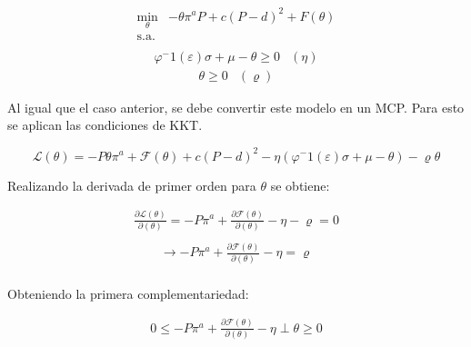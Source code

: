 \begin{equation}
\begin{array}{rrclcl}
   \displaystyle \min_{\theta} & -\theta \pi^aP + c(P-d)^2+F(\theta) \\\textrm{s.a.} \label{eq:perforconrestr}\\
\end{array}
\end{equation}
\begin{equation}
\begin{array}{cl}
    \varphi^-1 (\varepsilon )\sigma + \mu - \theta \geq 0 & (\eta)  \label{perforconrestr:r1}
\end{array}
\end{equation}
\begin{equation}
\begin{array}{cl}
    \theta \geq 0 & (\varrho)
\end{array}
\end{equation}

Al igual que el caso anterior, se debe convertir este modelo en un MCP. Para esto se aplican las condiciones de KKT.

$$\mathcal{L}(\theta)=-P\theta\pi^a+\mathcal{F}(\theta)+c(P-d)^2 -\eta(\varphi^-1 (\varepsilon )\sigma + \mu - \theta)- \varrho\theta $$

Realizando la derivada de primer orden para $\theta$ se obtiene:

\begin{equation}
\begin{array}{rrclcl}
    \frac{\partial\mathcal{L}(\theta)}{\partial (\theta)}=-P\pi^a+\frac{\partial\mathcal{F}(\theta)}{\partial(\theta)}-\eta -\varrho=0 \label{lag20}\\
\end{array}
\end{equation}
\begin{equation}
\begin{array}{rrclcl}
    \rightarrow -P\pi^a+\frac{\partial\mathcal{F}(\theta)}{\partial(\theta)}-\eta=\varrho \label{lag21}\\
\end{array}
\end{equation}

Obteniendo la primera complementariedad:

\begin{equation}
\begin{array}{rrclcl}
    0\leq -P\pi^a+\frac{\partial\mathcal{F}(\theta)}{\partial(\theta)}-\eta \perp \theta \geq 0 \label{compllag2}\\
\end{array}
\end{equation}

